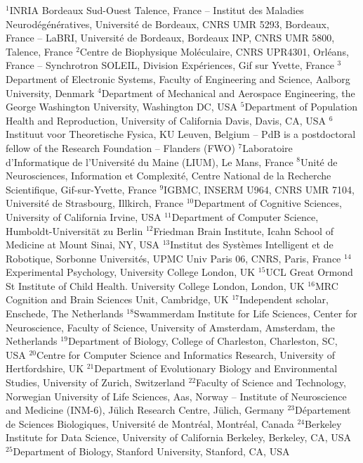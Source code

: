 $^{1}$INRIA Bordeaux Sud-Ouest Talence, France – Institut des Maladies Neurodégénératives, Université de Bordeaux, CNRS UMR 5293, Bordeaux, France – LaBRI, Université de Bordeaux, Bordeaux INP, CNRS UMR 5800, Talence, France
$^{2}$Centre de Biophysique Moléculaire, CNRS UPR4301, Orléans, France -- Synchrotron SOLEIL, Division Expériences, Gif sur Yvette, France
$^{3}$Department of Electronic Systems, Faculty of Engineering and Science, Aalborg University, Denmark
$^{4}$Department of Mechanical and Aerospace Engineering, the George Washington University, Washington DC, USA
$^{5}$Department of Population Health and Reproduction, University of California Davis, Davis, CA, USA
$^{6}$Instituut voor Theoretische Fysica, KU Leuven, Belgium -- PdB is a postdoctoral fellow of the Research Foundation -- Flanders (FWO)
$^{7}$Laboratoire d'Informatique de l'Université du Maine (LIUM), Le Mans, France
$^{8}$Unité de Neurosciences, Information et Complexité, Centre National de la Recherche Scientifique, Gif-sur-Yvette, France
$^{9}$IGBMC, INSERM U964, CNRS UMR 7104, Université de Strasbourg, Illkirch, France
$^{10}$Department of Cognitive Sciences, University of California Irvine, USA
$^{11}$Department of Computer Science, Humboldt-Universität zu Berlin
$^{12}$Friedman Brain Institute, Icahn School of Medicine at Mount Sinai, NY, USA
$^{13}$Institut des Systèmes Intelligent et de Robotique, Sorbonne Universités, UPMC Univ Paris 06, CNRS, Paris, France
$^{14}$Experimental Psychology, University College London, UK
$^{15}$UCL Great Ormond St Institute of Child Health. University College London, London, UK
$^{16}$MRC Cognition and Brain Sciences Unit, Cambridge, UK
$^{17}$Independent scholar, Enschede, The Netherlands
$^{18}$Swammerdam Institute for Life Sciences, Center for Neuroscience, Faculty of Science, University of Amsterdam, Amsterdam, the Netherlands
$^{19}$Department of Biology, College of Charleston, Charleston, SC, USA
$^{20}$Centre for Computer Science and Informatics Research, University of Hertfordshire, UK
$^{21}$Department of Evolutionary Biology and Environmental Studies, University of Zurich, Switzerland
$^{22}$Faculty of Science and Technology, Norwegian University of Life Sciences, Aas, Norway -- Institute of Neuroscience and Medicine (INM-6), Jülich Research Centre, Jülich, Germany
$^{23}$Département de Sciences Biologiques, Université de Montréal, Montréal, Canada
$^{24}$Berkeley Institute for Data Science, University of California Berkeley, Berkeley, CA, USA
$^{25}$Department of Biology, Stanford University, Stanford, CA, USA

